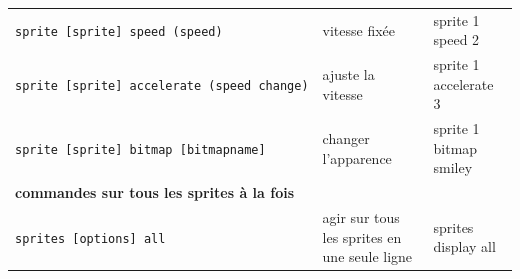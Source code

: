 \documentclass[
]{book}
\begin{document}
\begin{longtable}[]{@{}lll@{}}
\begin{minipage}[t]{0.40\columnwidth}
\texttt{sprite\ {[}sprite{]}\ speed\ (speed)}\strut
\end{minipage} & \begin{minipage}[t]{0.25\columnwidth}\raggedright
vitesse fixée\strut
\end{minipage} & \begin{minipage}[t]{0.25\columnwidth}\raggedright
sprite 1 speed 2\strut
\end{minipage}\tabularnewline
\begin{minipage}[t]{0.40\columnwidth}\raggedright
\texttt{sprite\ {[}sprite{]}\ accelerate\ (speed\ change)}\strut
\end{minipage} & \begin{minipage}[t]{0.25\columnwidth}\raggedright
ajuste la vitesse\strut
\end{minipage} & \begin{minipage}[t]{0.25\columnwidth}\raggedright
sprite 1 accelerate 3\strut
\end{minipage}\tabularnewline
\begin{minipage}[t]{0.40\columnwidth}\raggedright
\texttt{sprite\ {[}sprite{]}\ bitmap\ {[}bitmapname{]}}\strut
\end{minipage} & \begin{minipage}[t]{0.25\columnwidth}\raggedright
changer l'apparence\strut
\end{minipage} & \begin{minipage}[t]{0.25\columnwidth}\raggedright
sprite 1 bitmap smiley\strut
\end{minipage}\tabularnewline
\begin{minipage}[t]{0.40\columnwidth}\raggedright
\textbf{commandes sur tous les sprites à la fois}\strut
\end{minipage} & \begin{minipage}[t]{0.25\columnwidth}\raggedright
\strut
\end{minipage} & \begin{minipage}[t]{0.25\columnwidth}\raggedright
\strut
\end{minipage}\tabularnewline
\begin{minipage}[t]{0.40\columnwidth}\raggedright
\texttt{sprites\ {[}options{]}\ all}\strut
\end{minipage} & \begin{minipage}[t]{0.25\columnwidth}\raggedright
agir sur tous les sprites en une seule ligne\strut
\end{minipage} & \begin{minipage}[t]{0.25\columnwidth}\raggedright
sprites display all\strut
\end{minipage}\tabularnewline
\bottomrule
\end{longtable}
\end{document}
